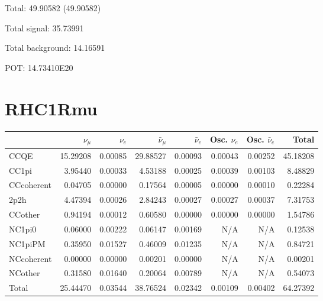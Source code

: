 \documentclass[10pt,a4paper]{article}
\begin{document}
Total: 49.90582    (49.90582)


Total signal: 35.73991


Total background: 14.16591

POT: 14.73410E20



\clearpage


\section*{RHC1Rmu}
\begin{tabular} { | l ||r | r | r | r | r | r | | r | }
\hline
              & $\nu_\mu$            & $\nu_e$              & $\bar{\nu}_{\mu}$    & $\bar{\nu}_{e}$      & Osc. $\nu_e$         & Osc. $\bar{\nu}_{e}$ & Total                \\ \hline\hline
 CCQE         & 15.29208             & 0.00085              & 29.88527             & 0.00093              & 0.00043              & 0.00252              & 45.18208             \\ \hline
 CC1pi        & 3.95440              & 0.00033              & 4.53188              & 0.00025              & 0.00039              & 0.00103              & 8.48829              \\ \hline
 CCcoherent   & 0.04705              & 0.00000              & 0.17564              & 0.00005              & 0.00000              & 0.00010              & 0.22284              \\ \hline
 2p2h         & 4.47394              & 0.00026              & 2.84243              & 0.00027              & 0.00027              & 0.00037              & 7.31753              \\ \hline
 CCother      & 0.94194              & 0.00012              & 0.60580              & 0.00000              & 0.00000              & 0.00000              & 1.54786              \\ \hline
 NC1pi0       & 0.06000              & 0.00222              & 0.06147              & 0.00169              & N/A                  & N/A                  & 0.12538              \\ \hline
 NC1piPM      & 0.35950              & 0.01527              & 0.46009              & 0.01235              & N/A                  & N/A                  & 0.84721              \\ \hline
 NCcoherent   & 0.00000              & 0.00000              & 0.00201              & 0.00000              & N/A                  & N/A                  & 0.00201              \\ \hline
 NCother      & 0.31580              & 0.01640              & 0.20064              & 0.00789              & N/A                  & N/A                  & 0.54073              \\ \hline
\hline
 Total        & 25.44470             & 0.03544              & 38.76524             & 0.02342              & 0.00109              & 0.00402              & 64.27392             \\ \hline

\end{tabular}
\end{document}
